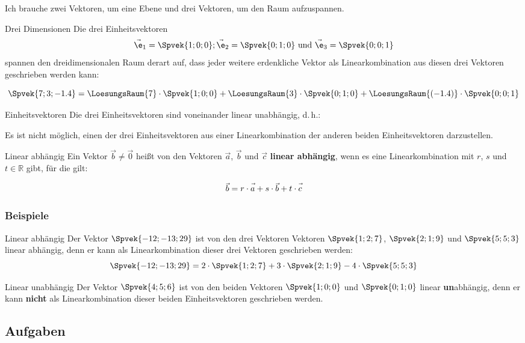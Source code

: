 Ich brauche zwei Vektoren, um eine Ebene und drei Vektoren, um den
Raum aufzuspannen.


\begin{bemerkung}{Drei Dimensionen}{}
  Die drei Einheitsvektoren
  $$\vec{\e}_1=\Spvek{1;0;0} ;
  \vec{\e}_2=\Spvek{0;1;0} \text{ und }
  \vec{\e}_3=\Spvek{0;0;1}$$
spannen den dreidimensionalen Raum derart auf, dass jeder weitere
erdenkliche Vektor als
Linearkombination aus diesen drei Vektoren geschrieben werden kann:

$$\Spvek{7;3;-1.4} = 
  \LoesungsRaum{  7   }\cdot{}\Spvek{1;0;0} + 
  \LoesungsRaum{  3   }\cdot{}\Spvek{0;1;0} +
  \LoesungsRaum{(-1.4)}\cdot{}\Spvek{0;0;1}$$
\end{bemerkung}

\begin{gesetz}{Einheitsvektoren}{}
  Die drei Einheitsvektoren sind voneinander linear unabhängig, d.\,h.:

  Es ist nicht möglich, einen der drei Einheitsvektoren aus einer
  Linearkombination der anderen beiden Einheitsvektoren darzustellen.
\end{gesetz}

\begin{definition}{Linear abhängig}{}
  Ein Vektor $\vec{b}\ne \vec{0}$ heißt von den Vektoren $\vec{a}$,
  $\vec{b}$ und $\vec{c}$ \textbf{linear abhängig}, wenn es eine
  Linearkombination mit $r$, $s$ und $t \in \mathbb{R}$ gibt, für die gilt:

  $$\vec{b} = r\cdot{}\vec{a\vphantom{b}} + s\cdot{}\vec{b} + t\cdot{}\vec{c\vphantom{b}}$$
  \end{definition}
\newpage
\subsubsection{Beispiele}%

\begin{beispiel}{Linear abhängig}{}
  Der Vektor $\Spvek{-12;-13;29}$ ist von den drei Vektoren 
    Vektoren $\Spvek{1;2;7}$, $\Spvek{2;1;9}$
    und $\Spvek{5;5;3}$  linear abhängig, denn
      er kann als Linearkombination dieser drei
      Vektoren geschrieben werden:
      $$\Spvek{-12;-13;29} = 2\cdot{}\Spvek{1;2;7} + 3\cdot{}
      \Spvek{2;1;9} -4\cdot{} \Spvek{5;5;3}$$
\end{beispiel}

\begin{beispiel}{Linear unabhängig}{}
  Der Vektor $\Spvek{4;5;6}$ ist von den beiden
    Vektoren $\Spvek{1;0;0}$
    und $\Spvek{0;1;0}$  linear \textbf{un}abhängig, denn
      er kann \textbf{nicht} als Linearkombination dieser beiden
      Einheitsvektoren geschrieben werden.
\end{beispiel}

\subsection*{Aufgaben}
